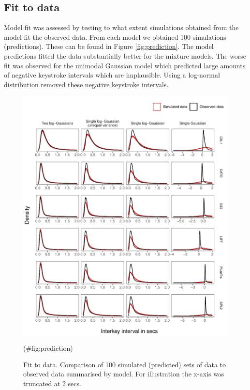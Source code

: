 \clearpage
\makeatletter
\efloat@restorefloats
\makeatother


\begin{appendix}
\section{}
\hypertarget{fit-to-data}{%
\subsection{Fit to data}\label{fit-to-data}}

Model fit was assessed by testing to what extent simulations obtained
from the model fit the observed data. From each model we obtained 100
simulations (predictions). These can be found in Figure
\ref{fig:prediction}. The model predictions fitted the data
substantially better for the mixture models. The worse fit was observed
for the unimodal Gaussian model which predicted large amounts of
negative keystroke intervals which are implausible. Using a log-normal
distribution removed these negative keystroke intervals.

\begin{figure}

{\centering \includegraphics{figures/fitplots} 

}

\caption{Fit to data. Comparison of 100 simulated (predicted) sets of data to observed data summarised by model. For illustration the x-axis was truncated at 2 secs.}(\#fig:prediction)
\end{figure}
\end{appendix}
